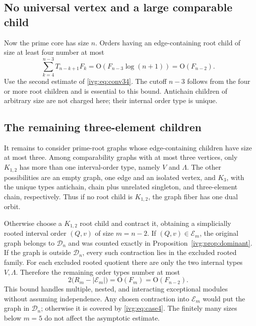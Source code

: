 \documentclass[11pt,letterpaper]{article}
\theoremstyle{definition}\newtheorem{definition}[theorem]{Definition}
\theoremstyle{remark}\newtheorem{remark}[theorem]{Remark}
\newcommand{\OO}{\mathrm O}
\begin{document}
\subsection{No universal vertex and a large comparable child}
Now the prime core has size $n$. Orders having an edge-containing root child of size at least four number at most
\begin{equation}\label{ivg:eq:case3}
 \sum_{k=4}^{n-3}T_{n-k+1}F_k
 =\OO(F_{n-3}\log(n+1))=\OO(F_{n-2}).
\end{equation}
Use the second estimate of \eqref{ivg:eq:conv34}. The cutoff $n-3$ follows from the four or more root children and is essential to this bound. Antichain children of arbitrary size are not charged here; their internal order type is unique.

\subsection{The remaining three-element children}
It remains to consider prime-root graphs whose edge-containing children have size at most three. Among comparability graphs with at most three vertices, only $K_{1,2}$ has more than one interval-order type, namely $V$ and $\Lambda$. The other possibilities are an empty graph, one edge and an isolated vertex, and $K_3$, with the unique types antichain, chain plus unrelated singleton, and three-element chain, respectively. Thus if no root child is $K_{1,2}$, the graph fiber has one dual orbit.

Otherwise choose a $K_{1,2}$ root child and contract it, obtaining a simplicially rooted interval order $(Q,v)$ of size $m=n-2$. If $(Q,v)\in\mathcal E_m$, the original graph belongs to $\mathcal D_n$ and was counted exactly in Proposition~\ref{ivg:prop:dominant}. If the graph is outside $\mathcal D_n$, every such contraction lies in the excluded rooted family. For each excluded rooted quotient there are only the two internal types $V,\Lambda$. Therefore the remaining order types number at most
\begin{equation}\label{ivg:eq:case4}
 2\bigl(R_m-|\mathcal E_m|\bigr)=\OO(F_m)=\OO(F_{n-2}).
\end{equation}
This bound handles multiple, nested, and interacting exceptional modules without assuming independence. Any chosen contraction into $\mathcal E_m$ would put the graph in $\mathcal D_n$; otherwise it is covered by \eqref{ivg:eq:case4}. The finitely many sizes below $m=5$ do not affect the asymptotic estimate.
\end{document}
